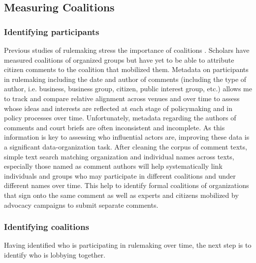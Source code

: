 
\subsection{Measuring Coalitions}






\subsubsection{Identifying participants}
Previous studies of rulemaking stress the importance of coalitions \citep{Yackee2006a}. Scholars have measured coalitions of organized groups but have yet to be able to attribute citizen comments to the coalition that mobilized them.
Metadata on participants in rulemaking including the date and author of comments (including the type of author, i.e. business, business group, citizen, public interest group, etc.)%
allows me to track and compare relative alignment  across venues and over time to assess whose ideas and interests are reflected at each stage of policymaking and in policy processes over time. %
Unfortunately, metadata regarding the authors of comments and court briefs are often inconsistent and incomplete. As this information is key to assessing who influential actors are, improving these data is a significant data-organization task. After cleaning the corpus of comment texts, simple text search matching organization and individual names across texts, especially those named as comment authors will help systematically link individuals and groups who may participate in different coalitions and under different names over time. This help to identify formal coalitions of organizations that sign onto the same comment as well as experts and citizens mobilized by advocacy campaigns to submit separate comments.

\subsubsection{Identifying coalitions }

Having identified who is participating in rulemaking over time, the next step is to identify who is lobbying together. 

